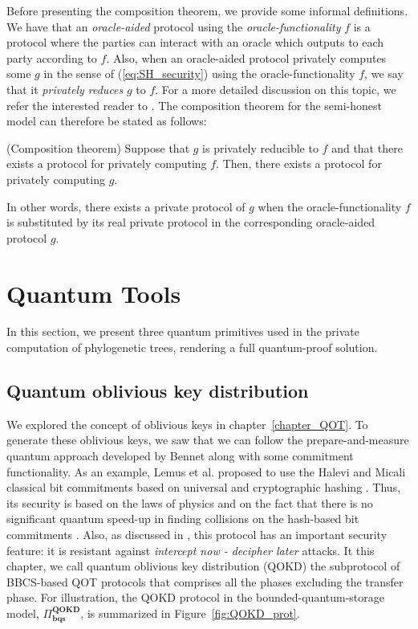 Before presenting the composition theorem, we provide some informal definitions. We have that an \textit{oracle-aided} protocol using the \textit{oracle-functionality} $f$ is a protocol where the parties can interact with an oracle which outputs to each party according to $f$. Also, when an oracle-aided protocol privately computes some $g$ in the sense of (\ref{eq:SH_security}) using the oracle-functionality $f$, we say that it \textit{privately reduces} $g$ to $f$. For a more detailed discussion on this topic, we refer the interested reader to \cite{Goldreich98}. The composition theorem for the semi-honest model can therefore be stated as follows:

\begin{theorem}(Composition theorem)\label{compositionthm}
Suppose that $g$ is privately reducible to $f$ and that there exists a protocol for privately computing $f$. Then, there exists a protocol for privately computing $g$.
\end{theorem}

In other words, there exists a private protocol of $g$ when the oracle-functionality $f$ is substituted by its real private protocol in the corresponding oracle-aided protocol $g$.



\section{Quantum Tools} \label{quantumTools}

In this section, we present three quantum primitives used in the private computation of phylogenetic trees, rendering a full quantum-proof solution.


\subsection{Quantum oblivious key distribution}

We explored the concept of oblivious keys in chapter~\ref{chapter_QOT}. To generate these oblivious keys, we saw that we can follow the prepare-and-measure quantum approach developed by Bennet \cite{BBCS91} along with some commitment functionality. As an example, Lemus et al. \cite{Lemus20} proposed to use the Halevi and Micali classical bit commitments based on universal and cryptographic hashing \cite{HM96}. Thus, its security is based on the laws of physics and on the fact that there is no significant quantum speed-up in finding collisions on the hash-based bit commitments \cite{Shi02, ABLST17, Lemus20}. Also, as discussed in \cite{Lemus20, Santos2021}, this protocol has an important security feature: it is resistant against \textit{intercept now - decipher later} attacks. It this chapter, we call quantum oblivious key distribution (QOKD) the subprotocol of BBCS-based QOT protocols that comprises all the phases excluding the transfer phase. For illustration, the QOKD protocol in the bounded-quantum-storage model, $\Pi^{\textbf{QOKD}}_{\textbf{bqs}}$, is summarized in Figure~\ref{fig:QOKD_prot}.

